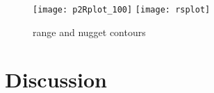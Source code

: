 \documentclass{article}\usepackage[]{graphicx}\usepackage[]{color}
\newenvironment{knitrout}{}{} %
\begin{document}
\begin{knitrout}
\color{fgcolor}\begin{figure}

{\centering \texttt{[image: p2Rplot\_100]} 
\texttt{[image: rsplot]} 

}

\caption[range and nugget contours]{range and nugget contours}\label{fig:showgraphs}
\end{figure}

\end{knitrout}





\section{Discussion}










  
  
\end{document}
